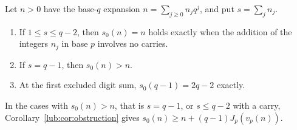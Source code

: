 \begin{theorem}\label{lub:thm:firstdepth}
Let $n>0$ have the base-$q$ expansion $n=\sum_{j\ge0}n_jq^j$, and put $s=\sum_jn_j$.
\begin{enumerate}[label=\textup{(\alph*)}]
\item If $1\le s\le q-2$, then $s_0(n)=n$ holds exactly when the addition of the integers
$n_j$ in base $p$ involves no carries.
\item If $s=q-1$, then $s_0(n)>n$.
\item At the first excluded digit sum, $s_0(q-1)=2q-2$ exactly.
\end{enumerate}
In the cases with $s_0(n)>n$, that is $s=q-1$, or $s\le q-2$ with a carry,
Corollary~\ref{lub:cor:obstruction} gives $s_0(n)\ge n+(q-1)J_p(v_p(n))$.
\end{theorem}
